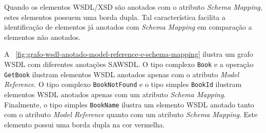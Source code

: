 
Quando os elementos WSDL/XSD são anotados com o atributo \textit{Schema Mapping}, estes elementos possuem uma borda dupla. Tal característica facilita a identificação de elementos já anotados com \textit{Schema Mapping} em comparação a elementos não anotados.

A \figurename~\ref{fig:grafo-wsdl-anotado-model-reference-e-schema-mapping} ilustra um grafo WSDL com diferentes anotações SAWSDL. O tipo complexo \texttt{Book} e a operação \texttt{GetBook} ilustram elementos WSDL anotados apenas com o atributo \textit{Model Reference}. O tipo complexo \texttt{BookNotFound} e o tipo simples \texttt{BookId} ilustram elementos WSDL anotados apenas com um atributo \textit{Schema Mapping}. Finalmente, o tipo simples \texttt{BookName} ilustra um elemento WSDL anotado tanto com o atributo \textit{Model Reference} quanto com um atributo \textit{Schema Mapping}. Este elemento possui uma borda dupla na cor vermelha.

